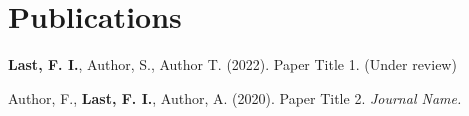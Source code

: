 \section[Publications]{ Publications}

\begin{zenumerate}
\item \textbf{Last, F. I.}, Author, S., Author T. (2022). Paper Title 1. (Under review)
\item Author, F., \textbf{Last, F. I.}, Author, A. (2020). Paper Title 2. \textit{Journal Name.}
\end{zenumerate}


